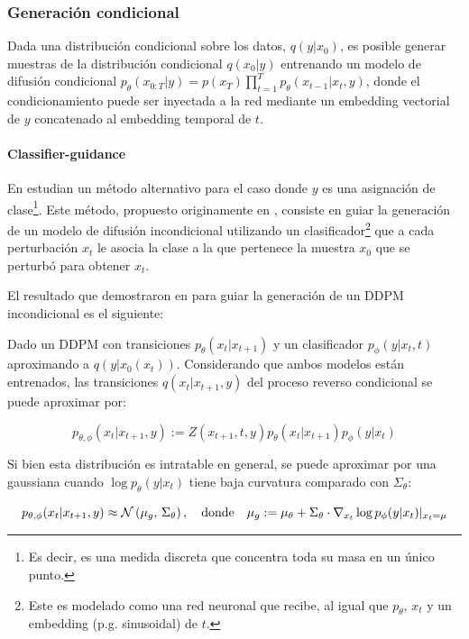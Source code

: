 \subsubsection{Generación condicional}

Dada una distribución condicional sobre los datos, $q(y|x_0)$, es posible generar muestras de la distribución condicional $q(x_0|y)$ entrenando un modelo de difusión condicional $p_\theta(x_{0:T}|y)=p(x_T)\prod_{t=1}^T p_\theta(x_{t-1}|x_t,y)$, donde el condicionamiento puede ser inyectada a la red mediante un embedding vectorial de $y$ concatenado al embedding temporal de $t$.

\paragraph{Classifier-guidance}

En \cite{dhariwal2021diffusion} estudian un método alternativo para el caso donde $y$ es una asignación de clase\footnote{Es decir, es una medida discreta que concentra toda su masa en un único punto.}. Este método, propuesto originamente en \cite{sohldickstein2015deep}, consiste en guiar la generación de un modelo de difusión incondicional utilizando un clasificador\footnote{Este es modelado como una red neuronal que recibe, al igual que $p_\theta$, $x_t$ y un embedding (p.g. sinusoidal) de $t$.} que a cada perturbación $x_t$ le asocia la clase a la que pertenece la muestra $x_0$ que se perturbó para obtener $x_t$.

El resultado que demostraron en \cite{dhariwal2021diffusion} para guiar la generación de un DDPM incondicional es el siguiente:

\begin{prop}
    \label{prop:classifier_guidance}
    Dado un DDPM con transiciones $p_\theta(x_t|x_{t+1})$ y un clasificador $p_\phi(y|x_t,t)$ aproximando a $q(y|x_0(x_t))$. Considerando que ambos modelos están entrenados, las transiciones $q(x_t|x_{t+1},y)$ del proceso reverso condicional se puede aproximar por:

    \begin{equation}
        \label{eq:class_guidance_joint}
        p_{\theta,\phi}(x_t|x_{t+1},y) := Z(x_{t+1},t,y) p_\theta(x_t|x_{t+1})p_\phi(y|x_t)
    \end{equation}

    Si bien esta distribución es intratable en general, se puede aproximar por una gaussiana cuando $\log p_\theta(y|x_t)$ tiene baja curvatura comparado con $\Sigma_\theta$:

    \begin{equation}
        p_{\theta,\phi}(x_t|x_{t+1},y) \approx \mathcal{N}\left(\mu_g,\,\Sigma_\theta\right),
        \quad\text{donde}\quad
        \mu_g := \mu_\theta + \Sigma_\theta \cdot \nabla_{x_t} \log p_\phi(y|x_t)|_{x_t=\mu}
    \end{equation}
\end{prop}

